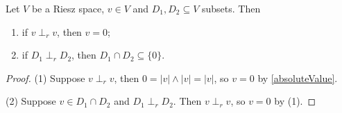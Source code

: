 \begin{lemma} \label{vectorDisjointWithItself}
Let $V$ be a Riesz space, $v\in V$ and $D_1, D_2 \subseteq V$ subsets. Then
\begin{enumerate}
\item if $v\perp_r v$, then $v = 0$;
\item if $D_1\perp_r D_2$, then $D_1\cap D_2 \subseteq \{0\}$.
\end{enumerate}
\end{lemma}
\begin{proof}
(1) Suppose $v\perp_r v$, then $0 = |v|\wedge |v| = |v|$, so $v = 0$ by \ref{absoluteValue}.

(2) Suppose $v\in D_1\cap D_2$ and $D_1\perp_r D_2$. Then $v\perp_r v$, so $v=0$ by (1).
\end{proof}

